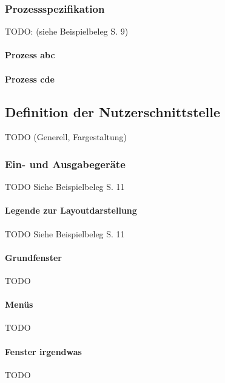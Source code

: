 \subsubsection{Prozessspezifikation}
TODO: (siehe Beispielbeleg S. 9)

\paragraph{Prozess abc}

\paragraph{Prozess cde}

\subsection{Definition der Nutzerschnittstelle}
TODO (Generell, Fargestaltung)

\subsubsection{Ein- und Ausgabegeräte}
TODO Siehe Beispielbeleg S. 11

\paragraph{Legende zur Layoutdarstellung}
TODO Siehe Beispielbeleg S. 11

\paragraph{Grundfenster}
TODO

\paragraph{Menüs}
TODO

\paragraph{Fenster irgendwas}
TODO